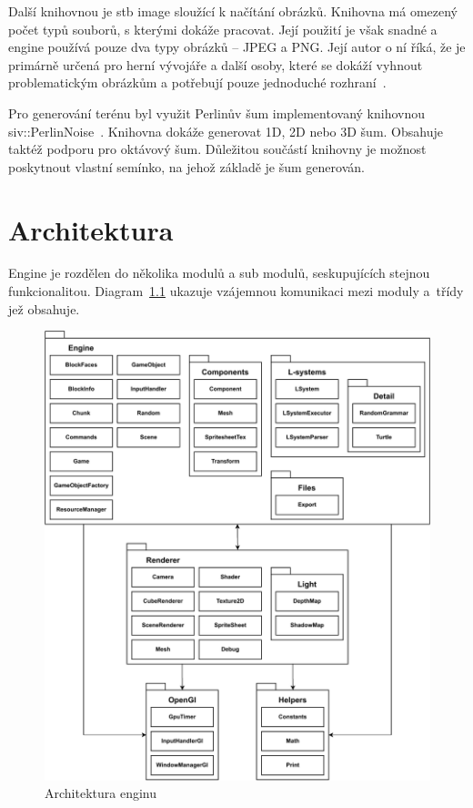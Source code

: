 \documentclass[thesis=M,czech]{FITthesis}[2019/12/23]
\begin{document}
Další knihovnou je stb image sloužící k načítání obrázků. Knihovna má omezený počet typů souborů, s kterými dokáže pracovat. Její použití je však snadné a engine používá pouze dva typy obrázků – JPEG a PNG. Její autor o ní říká, že je primárně určená pro herní vývojáře a další osoby, které se dokáží vyhnout problematickým obrázkům a potřebují pouze jednoduché rozhraní~\cite{stb_image}.

Pro generování terénu byl využit Perlinův šum implementovaný knihovnou siv::PerlinNoise~\cite{perlin}. Knihovna dokáže generovat 1D, 2D nebo 3D šum. Obsahuje taktéž podporu pro oktávový šum. Důležitou součástí knihovny je možnost poskytnout vlastní semínko, na jehož základě je šum generován.


\chapter{Architektura}

Engine je rozdělen do několika modulů a sub modulů, seskupujících stejnou funkcionalitou. Diagram~\ref{fig:architecture} ukazuje vzájemnou komunikaci mezi moduly a~třídy jež obsahuje.

\begin{figure}\centering
	\includegraphics[width=\textwidth]{images/architecture}
	\caption[Architektura enginu]{Architektura enginu}\label{fig:architecture}
\end{figure}
\end{document}
